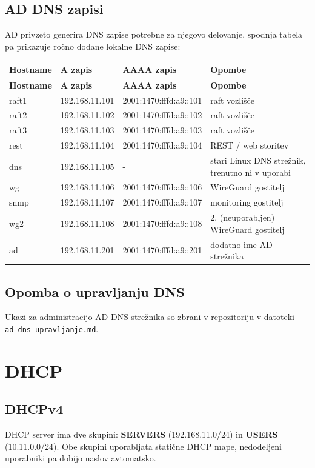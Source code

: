 \documentclass[a4paper,11pt]{article}
\begin{document}
\subsection{AD DNS zapisi}
AD privzeto generira DNS zapise potrebne za njegovo delovanje, spodnja tabela pa prikazuje ročno dodane lokalne DNS zapise: 
\begin{longtable}{|p{3cm}|l|l|p{4.2cm}|}
\hline
\textbf{Hostname} & \textbf{A zapis} & \textbf{AAAA zapis} & \textbf{Opombe} \\
\hline
\endfirsthead
\hline
\textbf{Hostname} & \textbf{A zapis} & \textbf{AAAA zapis} & \textbf{Opombe} \\
\hline
\endhead
raft1 & 192.168.11.101 & 2001:1470:fffd:a9::101 & raft vozlišče \\
raft2 & 192.168.11.102 & 2001:1470:fffd:a9::102 & raft vozlišče \\
raft3 & 192.168.11.103 & 2001:1470:fffd:a9::103 & raft vozlišče \\
rest & 192.168.11.104 & 2001:1470:fffd:a9::104 & REST / web storitev \\
dns & 192.168.11.105 & - & stari Linux DNS strežnik, trenutno ni v uporabi \\
wg & 192.168.11.106 & 2001:1470:fffd:a9::106 & WireGuard gostitelj \\
snmp & 192.168.11.107 & 2001:1470:fffd:a9::107 & monitoring gostitelj \\
wg2 & 192.168.11.108 & 2001:1470:fffd:a9::108 & 2. (neuporabljen) WireGuard gostitelj \\
ad & 192.168.11.201 & 2001:1470:fffd:a9::201 & dodatno ime AD strežnika \\
\hline
\end{longtable}

\subsection{Opomba o upravljanju DNS}
Ukazi za administracijo AD DNS strežnika so zbrani v repozitoriju v datoteki \texttt{ad-dns-upravljanje.md}.

\section{DHCP}

\subsection{DHCPv4}
DHCP server ima dve skupini: \textbf{SERVERS} (192.168.11.0/24) in \textbf{USERS} (10.11.0.0/24).
Obe skupini uporabljata statične DHCP mape, nedodeljeni uporabniki pa dobijo naslov avtomatsko.
\end{document}
